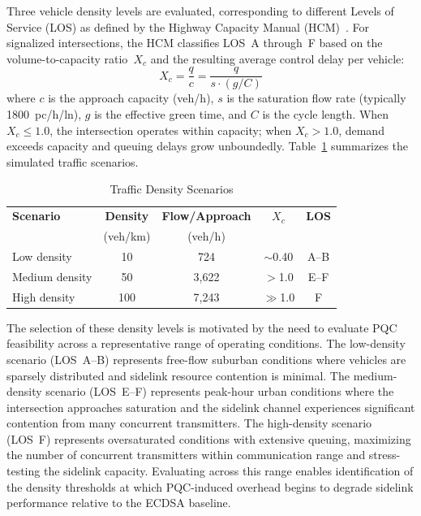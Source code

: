 \documentclass[letterpaper,journal]{IEEEtran}
\begin{document}
Three vehicle density levels are evaluated, corresponding to different Levels of Service (LOS) as defined by the Highway Capacity Manual (HCM)~\cite{hcm2010}. For signalized intersections, the HCM classifies LOS~A through~F based on the volume-to-capacity ratio~$X_c$ and the resulting average control delay per vehicle:
\begin{equation}
    X_c = \frac{q}{c} = \frac{q}{s \cdot (g/C)}
    \label{eq:vc_ratio}
\end{equation}
where $c$ is the approach capacity (veh/h), $s$ is the saturation flow rate (typically 1800~pc/h/ln), $g$ is the effective green time, and $C$ is the cycle length. When $X_c \leq 1.0$, the intersection operates within capacity; when $X_c > 1.0$, demand exceeds capacity and queuing delays grow unboundedly. Table~\ref{tab:traffic_scenarios} summarizes the simulated traffic scenarios.

\begin{table}[!htbp]
    \caption{Traffic Density Scenarios}
    \label{tab:traffic_scenarios}
    \centering
    \begin{tabular}{lcccc}
    \toprule
    \textbf{Scenario} & \textbf{Density} & \textbf{Flow/Approach} & $X_c$ & \textbf{LOS} \\
                      & (veh/km)         & (veh/h)               &       &              \\
    \midrule
    Low density    & 10  & 724   & $\sim$0.40 & A--B \\
    Medium density & 50  & 3{,}622 & $>$1.0     & E--F \\
    High density   & 100 & 7{,}243 & $\gg$1.0   & F    \\
    \bottomrule
    \end{tabular}
\end{table}

The selection of these density levels is motivated by the need to evaluate PQC feasibility across a representative range of operating conditions. The low-density scenario (LOS~A--B) represents free-flow suburban conditions where vehicles are sparsely distributed and sidelink resource contention is minimal. The medium-density scenario (LOS~E--F) represents peak-hour urban conditions where the intersection approaches saturation and the sidelink channel experiences significant contention from many concurrent transmitters. The high-density scenario (LOS~F) represents oversaturated conditions with extensive queuing, maximizing the number of concurrent transmitters within communication range and stress-testing the sidelink capacity. Evaluating across this range enables identification of the density thresholds at which PQC-induced overhead begins to degrade sidelink performance relative to the ECDSA baseline.
\end{document}
